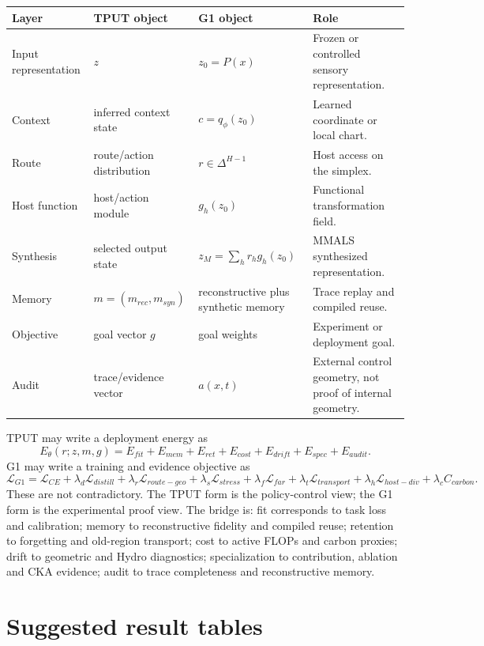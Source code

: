 \documentclass[11pt,a4paper]{article}
\newcommand{\loss}{\mathcal{L}}
\begin{document}
\begin{longtable}{@{}p{2.6cm}p{3.4cm}p{4.0cm}p{4.2cm}@{}}
\toprule
\textbf{Layer} & \textbf{TPUT object} & \textbf{G1 object} & \textbf{Role} \\
\midrule
Input representation & \(z\) & \(z_0=P(x)\) & Frozen or controlled sensory representation. \\
Context & inferred context state & \(c=q_\phi(z_0)\) & Learned coordinate or local chart. \\
Route & route/action distribution & \(r\in\Delta^{H-1}\) & Host access on the simplex. \\
Host function & host/action module & \(g_h(z_0)\) & Functional transformation field. \\
Synthesis & selected output state & \(z_M=\sum_h r_h g_h(z_0)\) & MMALS synthesized representation. \\
Memory & \(m=(m_{rec},m_{syn})\) & reconstructive plus synthetic memory & Trace replay and compiled reuse. \\
Objective & goal vector \(g\) & goal weights & Experiment or deployment goal. \\
Audit & trace/evidence vector & \(a(x,t)\) & External control geometry, not proof of internal geometry. \\
\bottomrule
\end{longtable}

TPUT may write a deployment energy as
\begin{equation}
E_\theta(r;z,m,g)=E_{fit}+E_{mem}+E_{ret}+E_{cost}+E_{drift}+E_{spec}+E_{audit}.
\end{equation}
G1 may write a training and evidence objective as
\begin{equation}
\loss_{G1}=\loss_{CE}+\lambda_d\loss_{distill}+\lambda_r\loss_{route-geo}+\lambda_s\loss_{stress}+\lambda_f\loss_{far}+\lambda_t\loss_{transport}+\lambda_h\loss_{host-div}+\lambda_c C_{carbon}.
\end{equation}
These are not contradictory. The TPUT form is the policy-control view; the G1 form is the experimental proof view. The bridge is: fit corresponds to task loss and calibration; memory to reconstructive fidelity and compiled reuse; retention to forgetting and old-region transport; cost to active FLOPs and carbon proxies; drift to geometric and Hydro diagnostics; specialization to contribution, ablation and CKA evidence; audit to trace completeness and reconstructive memory.

\section{Suggested result tables}
\end{document}
